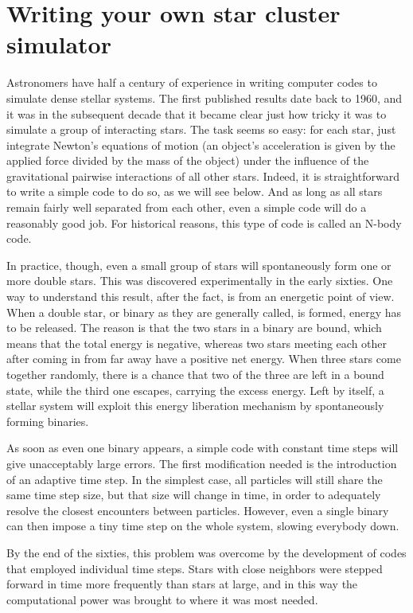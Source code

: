 \documentclass{book}
\begin{document}
\section{  Writing your own star cluster simulator}
\label{sect:10}

Astronomers have half a century of experience in writing computer
codes to simulate dense stellar systems.  The first published results
date back to 1960, and it was in the subsequent decade that it became
clear just how tricky it was to simulate a group of interacting stars.
The task seems so easy: for each star, just integrate Newton's
equations of motion (an object's acceleration is given by the applied
force divided by the mass of the object) under the influence of the
gravitational pairwise interactions of all other stars.  Indeed, it is
straightforward to write a simple code to do so, as we will see below.
And as long as all stars remain fairly well separated from each other,
even a simple code will do a reasonably good job.  For historical
reasons, this type of code is called an N-body code.

In practice, though, even a small group of stars will spontaneously
form one or more double stars.  This was discovered experimentally in
the early sixties.  One way to understand this result, after the fact,
is from an energetic point of view.  When a double star, or binary as
they are generally called, is formed, energy has to be released.  The
reason is that the two stars in a binary are bound, which means that
the total energy is negative, whereas two stars meeting each other
after coming in from far away have a positive net energy.  When
three stars come together randomly, there is a chance that two of the
three are left in a bound state, while the third one escapes, carrying
the excess energy.  Left by itself, a stellar system will exploit this
energy liberation mechanism by spontaneously forming binaries.

As soon as even one binary appears, a simple code with constant time
steps will give unacceptably large errors.  The first modification
needed is the introduction of an adaptive time step.  In the simplest
case, all particles will still share the same time step size, but that
size will change in time, in order to adequately resolve the closest
encounters between particles.  However, even a single binary can then
impose a tiny time step on the whole system, slowing everybody down.

By the end of the sixties, this problem was overcome by the
development of codes that employed individual time steps.  Stars with
close neighbors were stepped forward in time more frequently than
stars at large, and in this way the computational power was brought to
where it was most needed.
\end{document}
